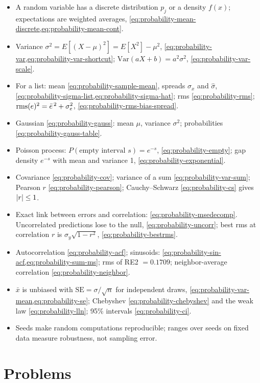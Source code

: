 \begin{itemize}
\item A random variable has a discrete distribution $p_j$ or a density $f(x)$; expectations are weighted averages, \cref{eq:probability-mean-discrete,eq:probability-mean-cont}.
\item Variance $\sigma^2=E[(X-\mu)^2]=E[X^2]-\mu^2$, \cref{eq:probability-var,eq:probability-var-shortcut}; $\mathrm{Var}(aX+b)=a^2\sigma^2$, \cref{eq:probability-var-scale}.
\item For a list: mean \cref{eq:probability-sample-mean}, spreads $\sigma_x$ and $\hat\sigma$, \cref{eq:probability-sigma-list,eq:probability-sigma-hat}; rms \cref{eq:probability-rms}; $\mathrm{rms}(e)^2=\bar e^{\,2}+\sigma_e^2$, \cref{eq:probability-rms-bias-spread}.
\item Gaussian \cref{eq:probability-gauss}: mean $\mu$, variance $\sigma^2$; probabilities \cref{eq:probability-gauss-table}.
\item Poisson process: $P(\text{empty interval }s)=e^{-s}$, \cref{eq:probability-empty}; gap density $e^{-s}$ with mean and variance 1, \cref{eq:probability-exponential}.
\item Covariance \cref{eq:probability-cov}; variance of a sum \cref{eq:probability-var-sum}; Pearson $r$ \cref{eq:probability-pearson}; Cauchy--Schwarz \cref{eq:probability-cs} gives $\left\lvert r\right\rvert\le1$.
\item Exact link between errors and correlation: \cref{eq:probability-msedecomp}. Uncorrelated predictions lose to the null, \cref{eq:probability-uncorr}; best rms at correlation $r$ is $\sigma_y\sqrt{1-r^2}$, \cref{eq:probability-bestrms}.
\item Autocorrelation \cref{eq:probability-acf}; sinusoids: \cref{eq:probability-sin-acf,eq:probability-sum-ms}; rms of RE2 $=0.1709$; neighbor-average correlation \cref{eq:probability-neighbor}.
\item $\bar x$ is unbiased with $\mathrm{SE}=\sigma/\sqrt n$ for independent draws, \cref{eq:probability-var-mean,eq:probability-se}; Chebyshev \cref{eq:probability-chebyshev} and the weak law \cref{eq:probability-lln}; 95\% intervals \cref{eq:probability-ci}.
\item Seeds make random computations reproducible; ranges over seeds on fixed data measure robustness, not sampling error.
\end{itemize}

\section{Problems}

